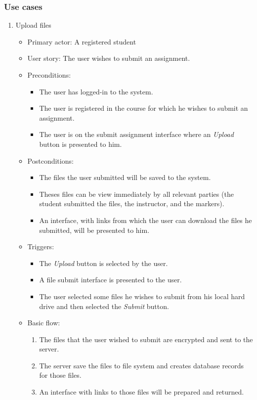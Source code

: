 \subsubsection{Use cases}
\begin{enumerate}

\item Upload files
\begin{itemize}
    \item Primary actor: A registered student
    \item User story: The user wishes to submit an assignment.
    \item Preconditions:
        \begin{itemize}
            \item The user has logged-in to the system.
            \item The user is registered in the course for which he wishes to
                submit an assignment.
            \item The user is on the submit assignment interface where an
                \emph{Upload} button is presented to him.
        \end{itemize}
    \item Postconditions:
        \begin{itemize}
            \item The files the user submitted will be saved to the system.
            \item Theses files can be view immediately by all relevant parties
                (the student submitted the files, the instructor,
                and the markers).
            \item An interface, with links from which the user can
                download the files he submitted, will be presented
                to him.
        \end{itemize}
    \item Triggers:
        \begin{itemize}
            \item The \emph{Upload} button is selected by the user.
            \item A file submit interface is presented to the user.
            \item The user selected some files he wishes to submit from his
                local hard drive and then selected the \emph{Submit} button.
        \end{itemize}
    \item Basic flow:
        \begin{enumerate}
            \item The files that the user wished to submit are encrypted and
                sent to the server.
            \item The server save the files to file system and creates database
                records for those files.
            \item An interface with links to those files will be prepared and
                returned.
        \end{enumerate}
\end{itemize}


\end{enumerate}
